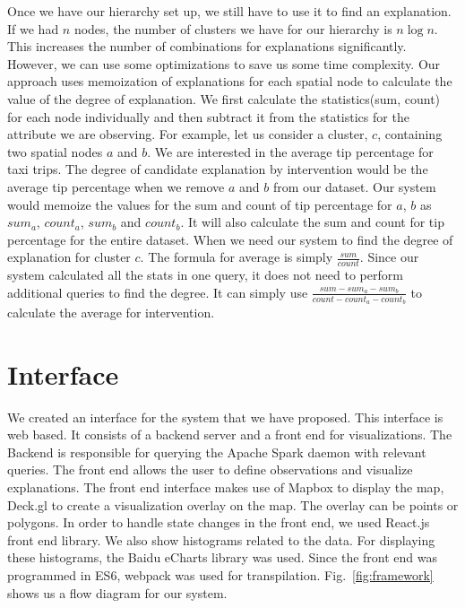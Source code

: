 Once we have our hierarchy set up, we still have to use it to find an explanation. If we had $n$ nodes, the number of clusters we have for our hierarchy is $n \log n$.  This increases the number of combinations for explanations significantly. However, we can use some optimizations to save us some time complexity. Our approach uses memoization of explanations for each spatial node to calculate the value of the degree of explanation. We first calculate the statistics(sum, count) for each node individually and then subtract it from the statistics for the attribute we are observing. For example, let us consider a cluster, $c$, containing two spatial nodes $a$ and $b$. We are interested in the average tip percentage for taxi trips. The degree of candidate explanation by intervention would be the average tip percentage when we remove $a$ and $b$ from our dataset. Our system would memoize the values for the sum and count of tip percentage for $a$, $b$ as $sum_a$, $count_a$, $sum_b$ and $count_b$. It will also calculate the sum and count for tip percentage for the entire dataset. When we need our system to find the degree of explanation for cluster $c$. The formula for average is simply $\frac{sum}{count}$. Since our system calculated all the stats in one query, it does not need to perform additional queries to find the degree. It can simply use $\frac{sum-sum_a-sum_b}{count-count_a-count_b}$ to calculate the average for intervention.


\section{Interface}



We created an interface for the system that we have proposed. This interface is web based. It consists of a backend server and a front end for visualizations. The Backend is responsible for querying the Apache Spark daemon with relevant queries. The front end allows the user to define observations and visualize explanations. The front end interface makes use of Mapbox to display the map, Deck.gl to create a visualization overlay on the map. The overlay can be points or polygons. In order to handle state changes in the front end, we used React.js front end library. We also show histograms related to the data. For displaying these histograms, the Baidu eCharts library was used. Since the front end was programmed in ES6, webpack was used for transpilation\citep{webpack}. Fig.~\ref{fig:framework} shows us a flow diagram for our system.

